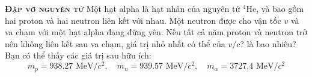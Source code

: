 \begin{problem}{\textbf{\textsc{Đập vỡ nguyên tử}}}
Một hạt alpha là hạt nhân của nguyên tử $^4\text{He}$, và bao gồm hai proton và hai neutron liên kết với nhau. Một neutron được cho vận tốc $v$ và va chạm với một hạt alpha đang đứng yên. Nếu tất cả năm proton và neutron trở nên không liên kết sau va chạm, giá trị nhỏ nhất có thể của $v/c$? là bao nhiêu? Bạn có thể thấy các giá trị sau hữu ích:
$$m_p = 938.27\text{ MeV}/c^2,\quad m_n = 939.57\text{ MeV}/c^2,\quad m_{\alpha} = 3727.4\text{ MeV}/c^2$$
\end{problem}
